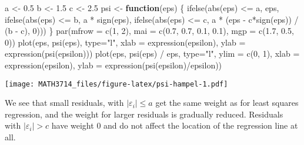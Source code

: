 \documentclass[
  a4paper,
]{article}
\newenvironment{Shaded}{\begin{snugshade}}{\end{snugshade}}
\newcommand{\AttributeTok}[1]{\textcolor[rgb]{0.77,0.63,0.00}{#1}}
\newcommand{\ControlFlowTok}[1]{\textcolor[rgb]{0.13,0.29,0.53}{\textbf{#1}}}
\newcommand{\DecValTok}[1]{\textcolor[rgb]{0.00,0.00,0.81}{#1}}
\newcommand{\FloatTok}[1]{\textcolor[rgb]{0.00,0.00,0.81}{#1}}
\newcommand{\FunctionTok}[1]{\textcolor[rgb]{0.00,0.00,0.00}{#1}}
\newcommand{\NormalTok}[1]{#1}
\newcommand{\OtherTok}[1]{\textcolor[rgb]{0.56,0.35,0.01}{#1}}
\newcommand{\SpecialCharTok}[1]{\textcolor[rgb]{0.00,0.00,0.00}{#1}}
\newcommand{\StringTok}[1]{\textcolor[rgb]{0.31,0.60,0.02}{#1}}
\theoremstyle{definition}
\theoremstyle{definition}
\theoremstyle{definition}
\theoremstyle{definition}
\theoremstyle{remark}
\begin{document}
\begin{Shaded}
\begin{Highlighting}[]
\NormalTok{a }\OtherTok{\textless{}{-}} \FloatTok{0.5}
\NormalTok{b }\OtherTok{\textless{}{-}} \FloatTok{1.5}
\NormalTok{c }\OtherTok{\textless{}{-}} \FloatTok{2.5}
\NormalTok{psi }\OtherTok{\textless{}{-}} \ControlFlowTok{function}\NormalTok{(eps) \{}
    \FunctionTok{ifelse}\NormalTok{(}\FunctionTok{abs}\NormalTok{(eps) }\SpecialCharTok{\textless{}=}\NormalTok{ a, eps,}
           \FunctionTok{ifelse}\NormalTok{(}\FunctionTok{abs}\NormalTok{(eps) }\SpecialCharTok{\textless{}=}\NormalTok{ b, a }\SpecialCharTok{*} \FunctionTok{sign}\NormalTok{(eps),}
                  \FunctionTok{ifelse}\NormalTok{(}\FunctionTok{abs}\NormalTok{(eps) }\SpecialCharTok{\textless{}=}\NormalTok{ c,}
\NormalTok{                         a }\SpecialCharTok{*}\NormalTok{ (eps }\SpecialCharTok{{-}}\NormalTok{ c}\SpecialCharTok{*}\FunctionTok{sign}\NormalTok{(eps)) }\SpecialCharTok{/}\NormalTok{ (b }\SpecialCharTok{{-}}\NormalTok{ c),}
                         \DecValTok{0}\NormalTok{)))}
\NormalTok{\}}
\FunctionTok{par}\NormalTok{(}\AttributeTok{mfrow =} \FunctionTok{c}\NormalTok{(}\DecValTok{1}\NormalTok{, }\DecValTok{2}\NormalTok{),}
    \AttributeTok{mai =} \FunctionTok{c}\NormalTok{(}\FloatTok{0.7}\NormalTok{, }\FloatTok{0.7}\NormalTok{, }\FloatTok{0.1}\NormalTok{, }\FloatTok{0.1}\NormalTok{),}
    \AttributeTok{mgp =} \FunctionTok{c}\NormalTok{(}\FloatTok{1.7}\NormalTok{, }\FloatTok{0.5}\NormalTok{, }\DecValTok{0}\NormalTok{))}
\FunctionTok{plot}\NormalTok{(eps, }\FunctionTok{psi}\NormalTok{(eps), }\AttributeTok{type=}\StringTok{"l"}\NormalTok{,}
     \AttributeTok{xlab =} \FunctionTok{expression}\NormalTok{(epsilon), }\AttributeTok{ylab =} \FunctionTok{expression}\NormalTok{(}\FunctionTok{psi}\NormalTok{(epsilon)))}
\FunctionTok{plot}\NormalTok{(eps, }\FunctionTok{psi}\NormalTok{(eps) }\SpecialCharTok{/}\NormalTok{ eps, }\AttributeTok{type=}\StringTok{"l"}\NormalTok{, }\AttributeTok{ylim =} \FunctionTok{c}\NormalTok{(}\DecValTok{0}\NormalTok{, }\DecValTok{1}\NormalTok{),}
     \AttributeTok{xlab =} \FunctionTok{expression}\NormalTok{(epsilon),}
     \AttributeTok{ylab =} \FunctionTok{expression}\NormalTok{(}\FunctionTok{psi}\NormalTok{(epsilon)}\SpecialCharTok{/}\NormalTok{epsilon))}
\end{Highlighting}
\end{Shaded}

\texttt{[image: MATH3714\_files/figure-latex/psi-hampel-1.pdf]}

We see that small residuals, with \(|\varepsilon_i| \leq a\) get the same weight
as for least squares regression, and the weight for larger residuals
is gradually reduced. Residuals with \(|\varepsilon_i| > c\) have weight \(0\)
and do not affect the location of the regression line at all.
\end{document}
